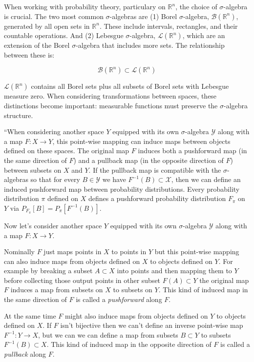 \documentclass[
  letterpaper,
  DIV=11,
  numbers=noendperiod]{scrartcl}
\begin{document}
When working with probability theory, particulary on \(\mathbb{R}^n\),
the choice of \(\sigma\)-algebra is crucial. The two most common
\(\sigma\)-algebras are (1) Borel \(\sigma\)-algebra,
\(\mathcal{B}(\mathbb{R}^n)\), generated by all open sets in
\(\mathbb{R}^n\). These include intervals, rectangles, and their
countable operations. And (2) Lebesgue \(\sigma\)-algebra,
\(\mathcal{L}(\mathbb{R}^n)\), which are an extension of the Borel
\(\sigma\)-algebra that includes more sets. The relationship between
these is:

\[
\mathcal{B}(\mathbb{R}^n) \subset \mathcal{L}(\mathbb{R}^n)
\]

\(\mathcal{L}(\mathbb{R}^n)\) contains all Borel sets plus all subsets
of Borel sets with Lebesgue measure zero. When considering
transformations between spaces, these distinctions become important:
measurable functions must preserve the \(\sigma\)-algebra structure.

``When considering another space \(Y\) equipped with its own
\(\sigma\)-algebra \(\mathcal{Y}\) along with a map
\(F: X \rightarrow Y\), this point-wise mapping can induce maps between
objects defined on these spaces. The original map \(F\) induces both a
pushforward map (in the same direction of \(F\)) and a pullback map (in
the opposite direction of \(F\)) between subsets on \(X\) and \(Y\). If
the pullback map is compatible with the \(\sigma\)-algebras so that for
every \(B \in \mathcal{Y}\) we have \(F^{-1}(B) \subset \mathcal{X}\),
then we can define an induced pushforward map between probability
distributions. Every probability distribution \(\pi\) defined on \(X\)
defines a pushforward probability distribution \(F_\pi\) on \(Y\) via
\(P_{F_\pi}[B] = P_\pi[F^{-1}(B)]\).

Now let's consider another space \(Y\) equipped with its own
\(\sigma\)-algebra \(\mathcal{Y}\) along with a map
\(F: X \rightarrow Y\).

Nominally \(F\) just maps points in \(X\) to points in \(Y\) but this
point-wise mapping can also induce maps from objects defined on \(X\) to
objects defined on \(Y\). For example by breaking a subset
\(A \subset X\) into points and then mapping them to \(Y\) before
collecting those output points in other subset \(F(A) \subset Y\) the
original map \(F\) induces a map from subsets on \(X\) to subsets on
\(Y\). This kind of induced map in the same direction of \(F\) is called
a \emph{pushforward} along \(F\).

At the same time \(F\) might also induce maps from objects defined on
\(Y\) to objects defined on \(X\). If \(F\) isn't bijective then we
can't define an inverse point-wise map \(F^{-1} : Y \rightarrow X\), but
we can we can define a map from subsets \(B \subset Y\) to subsets
\(F^{-1}(B) \subset X\). This kind of induced map in the opposite
direction of \(F\) is called a \emph{pullback} along \(F\).
\end{document}
